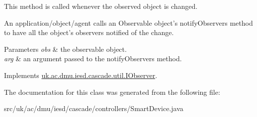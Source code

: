 This method is called whenever the observed object is changed. 

An application/object/agent calls an {\ttfamily Observable} object's {\ttfamily notify\-Observers} method to have all the object's observers notified of the change.


\begin{DoxyParams}{Parameters}
{\em obs} & the observable object. \\
\hline
{\em arg} & an argument passed to the {\ttfamily notify\-Observers} method. \\
\hline
\end{DoxyParams}


Implements \hyperlink{interfaceuk_1_1ac_1_1dmu_1_1iesd_1_1cascade_1_1util_1_1_i_observer_a4a1251fa996fd058f4f1f61c0e9e57e3}{uk.\-ac.\-dmu.\-iesd.\-cascade.\-util.\-I\-Observer}.



The documentation for this class was generated from the following file\-:\begin{DoxyCompactItemize}
\item 
src/uk/ac/dmu/iesd/cascade/controllers/Smart\-Device.\-java\end{DoxyCompactItemize}
